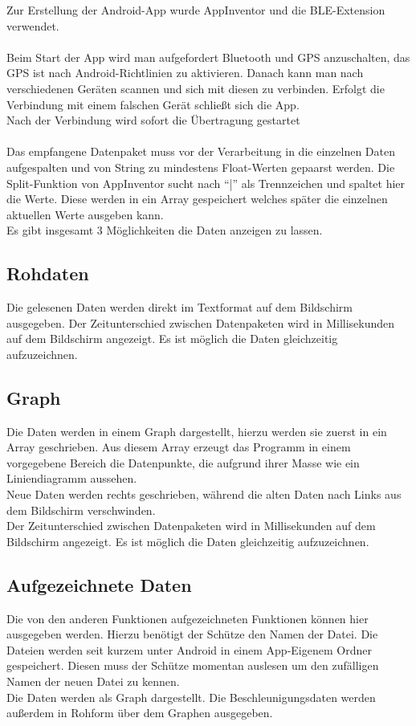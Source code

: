 Zur Erstellung der Android-App wurde AppInventor und die BLE-Extension verwendet.\\
\\
Beim Start der App wird man aufgefordert Bluetooth und GPS anzuschalten, das GPS
ist nach Android-Richtlinien zu aktivieren. Danach kann man nach verschiedenen
Geräten scannen und sich mit diesen zu verbinden. Erfolgt die Verbindung mit einem
falschen Gerät schließt sich die App.\\
Nach der Verbindung wird sofort die Übertragung gestartet\\
\\
Das empfangene Datenpaket muss vor der Verarbeitung in die einzelnen Daten
aufgespalten und von String zu mindestens Float-Werten gepaarst werden.
Die Split-Funktion von AppInventor sucht nach ``|'' als Trennzeichen und spaltet
hier die Werte. Diese werden in ein Array gespeichert welches später
die einzelnen aktuellen Werte ausgeben kann.\\
Es gibt insgesamt 3 Möglichkeiten die Daten anzeigen zu lassen.

\subsection{Rohdaten}
Die gelesenen Daten werden direkt im Textformat auf dem Bildschirm ausgegeben.
Der Zeitunterschied zwischen Datenpaketen wird in Millisekunden auf dem Bildschirm
angezeigt.
Es ist möglich die Daten gleichzeitig aufzuzeichnen.

\subsection{Graph}
Die Daten werden in einem Graph dargestellt, hierzu werden sie zuerst in ein
Array geschrieben. Aus diesem Array erzeugt das Programm in einem vorgegebene Bereich
die Datenpunkte, die aufgrund ihrer Masse wie ein Liniendiagramm aussehen.\\
Neue Daten werden rechts geschrieben, während die alten Daten nach Links aus dem
Bildschirm verschwinden.\\
Der Zeitunterschied zwischen Datenpaketen wird in Millisekunden auf dem Bildschirm
angezeigt.
Es ist möglich die Daten gleichzeitig aufzuzeichnen.

\subsection{Aufgezeichnete Daten}
Die von den anderen Funktionen aufgezeichneten Funktionen können hier ausgegeben
werden. Hierzu benötigt der Schütze den Namen der Datei. Die Dateien werden
seit kurzem unter Android in einem App-Eigenem Ordner gespeichert. Diesen muss
der Schütze momentan auslesen um den zufälligen Namen der neuen Datei zu kennen.\\
Die Daten werden als Graph dargestellt. Die Beschleunigungsdaten werden außerdem
in Rohform über dem Graphen ausgegeben.